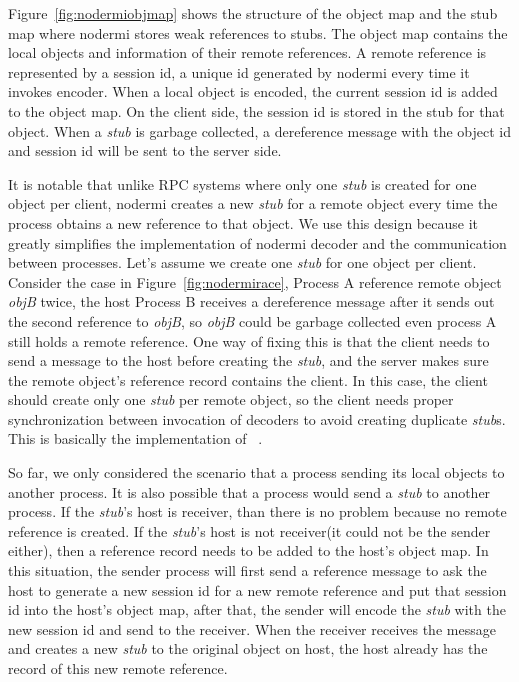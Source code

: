 \nodrmiobjmapfig{}

Figure~\ref{fig:nodermiobjmap} shows the structure of
the object map and the stub map where nodermi stores weak references to stubs.
The object map contains the local objects and information of
their remote references.
A remote reference is represented by a session id,
a unique id generated by nodermi every time it invokes encoder.
When a local object is encoded, the current session id is added to 
the object map.
On the client side, the session id is stored in the stub for that object.
When a \emph{stub} is garbage collected,
a dereference message with the object id and session id will 
be sent to the server side.


\nodrmiracefig{}


It is notable that 
unlike RPC systems 
where only one \emph{stub} is created for one object per client,
nodermi creates a new \emph{stub} for a remote object every time
the process obtains a new reference to that object.
We use this design because it
greatly simplifies the implementation of nodermi decoder and
the communication between processes.
Let's assume we create one \emph{stub} for one object per client.
Consider the case in Figure~\ref{fig:nodermirace},
Process A reference remote object \emph{objB} twice,
the host Process B receives a dereference message
after it sends out the second reference to \emph{objB},
so \emph{objB} could be garbage collected even process A still holds a remote
reference.
One way of fixing this is that
the client needs to send a message to the host before creating the \emph{stub},
and the server makes sure the remote object's reference record contains the client.
In this case, the client should create only one \emph{stub} per remote object,
so the client needs proper synchronization between invocation of decoders to
avoid creating duplicate \emph{stub}s. This is basically the implementation
of ~\cite{birrell1993distributed}. %


So far, we only considered the scenario that a process sending its local
objects to another process.
It is also possible that a process would send a \emph{stub} to another process.
If the \emph{stub}'s host is receiver, than there is no problem because no remote
reference is created.
If the \emph{stub}'s host is not receiver(it could not be the sender either),
then 
a reference record needs to be added to the host's object map.
In this situation,
the sender process will first send a reference message to 
ask the host
to generate a new session id for a new remote reference
and put that session id into the host's object map,
after that, 
the sender will encode the \emph{stub} with the new session id
and send to the receiver.
When the receiver receives the message and
creates a new \emph{stub} to the original object on host,
the host already has the record of this new remote reference.


